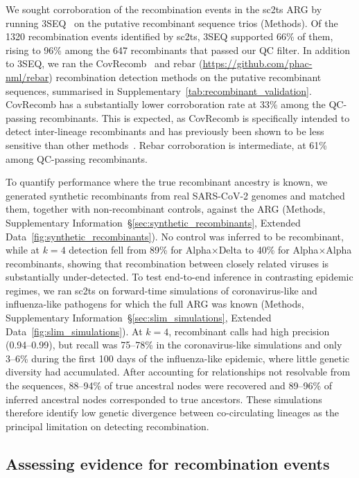 \documentclass[12pt]{article}
\newcommand{\supref}[1]{Supplementary Information~\S\ref{#1}}
\newcommand{\edref}[1]{Extended Data~\ref{#1}}
\newcommand{\siref}[1]{Supplementary~\ref{#1}}
\begin{document}
We sought corroboration of the recombination events in the sc2ts ARG
by running 3SEQ~\cite{Lam2018improved}
on the putative recombinant sequence trios (Methods).
Of the 1320 recombination events identified by sc2ts,
3SEQ supported 66\% of them,
rising to 96\% among the 647 recombinants that passed our QC filter.
In addition to 3SEQ, we ran the CovRecomb~\cite{Li2024CovRecomb}
and rebar (\url{https://github.com/phac-nml/rebar}) recombination detection methods
on the putative recombinant sequences,
summarised in \siref{tab:recombinant_validation}.
CovRecomb has a substantially lower corroboration rate
at 33\% among the QC-passing recombinants.
This is expected, as CovRecomb is specifically intended
to detect inter-lineage recombinants
and has previously been shown to be
less sensitive than other methods~\cite{Li2024CovRecomb}.
Rebar corroboration is intermediate, at 61\% among QC-passing recombinants.

To quantify performance where the true recombinant ancestry is known, we
generated synthetic recombinants from real SARS-CoV-2 genomes and matched them,
together with non-recombinant controls, against the ARG (Methods,
\supref{sec:synthetic_recombinants}, \edref{fig:synthetic_recombinants}).
No control was inferred to be recombinant, while at \(k=4\)
detection fell from 89\% for Alpha$\times$Delta to 40\% for Alpha$\times$Alpha
recombinants, showing that recombination between closely related viruses
is substantially under-detected.
To test end-to-end inference in contrasting epidemic regimes,
we ran sc2ts on forward-time simulations of coronavirus-like and influenza-like
pathogens for which the full ARG was known
(Methods, \supref{sec:slim_simulations}, \edref{fig:slim_simulations}).
At \(k=4\), recombinant calls had high precision (0.94--0.99), but recall was
75--78\% in the coronavirus-like simulations and only 3--6\% during the first 100
days of the influenza-like epidemic, where little genetic diversity had
accumulated. After accounting for relationships not resolvable from the
sequences, 88--94\% of true ancestral nodes were recovered and 89--96\% of inferred
ancestral nodes corresponded to true ancestors. These simulations therefore
identify low genetic divergence between co-circulating lineages as the
principal limitation on detecting recombination.

\subsection*{Assessing evidence for recombination events}
\end{document}
